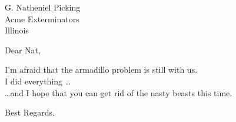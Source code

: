 

\address{1234 Avenue of the Armadillos \\
         Gnu York, G.Y. 56789}
\signature{R. (Ma) Dillo \\ Director of Cuisine}

\begin{letter}{G. Natheniel Picking \\
               Acme Exterminators \\
               Illinois}

\opening{Dear Nat,}

I'm afraid that the armadillo problem is still with us. 
\\I did everything \ldots \\

\ldots and I hope that you can get rid of the nasty beasts this time.

\closing{Best Regards,}
\end{letter}


